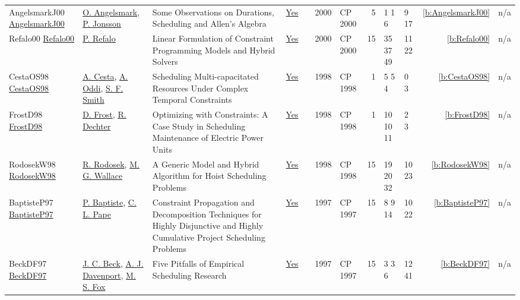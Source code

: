 {\begin{longtable}{>{\raggedright\arraybackslash}p{3cm}>{\raggedright\arraybackslash}p{4.5cm}>{\raggedright\arraybackslash}p{6.0cm}rrrp{2.5cm}rp{1cm}p{1cm}rr}
AngelsmarkJ00 \href{https://doi.org/10.1007/3-540-45349-0_35}{AngelsmarkJ00} & \hyperref[auth:a295]{O. Angelsmark}, \hyperref[auth:a296]{P. Jonsson} & Some Observations on Durations, Scheduling and Allen's Algebra & \href{../works/AngelsmarkJ00.pdf}{Yes} & \cite{AngelsmarkJ00} & 2000 & CP 2000 & 5 & 1 1 6 & 9 17 & \ref{b:AngelsmarkJ00} & n/a\\
Refalo00 \href{https://doi.org/10.1007/3-540-45349-0_27}{Refalo00} & \hyperref[auth:a254]{P. Refalo} & Linear Formulation of Constraint Programming Models and Hybrid Solvers & \href{../works/Refalo00.pdf}{Yes} & \cite{Refalo00} & 2000 & CP 2000 & 15 & 35 37 49 & 11 22 & \ref{b:Refalo00} & n/a\\
CestaOS98 \href{https://doi.org/10.1007/3-540-49481-2_36}{CestaOS98} & \hyperref[auth:a284]{A. Cesta}, \hyperref[auth:a282]{A. Oddi}, \hyperref[auth:a298]{S. F. Smith} & Scheduling Multi-capacitated Resources Under Complex Temporal Constraints & \href{../works/CestaOS98.pdf}{Yes} & \cite{CestaOS98} & 1998 & CP 1998 & 1 & 5 5 4 & 0 3 & \ref{b:CestaOS98} & n/a\\
FrostD98 \href{https://doi.org/10.1007/3-540-49481-2_40}{FrostD98} & \hyperref[auth:a299]{D. Frost}, \hyperref[auth:a300]{R. Dechter} & Optimizing with Constraints: {A} Case Study in Scheduling Maintenance of Electric Power Units & \href{../works/FrostD98.pdf}{Yes} & \cite{FrostD98} & 1998 & CP 1998 & 1 & 10 10 11 & 2 3 & \ref{b:FrostD98} & n/a\\
RodosekW98 \href{https://doi.org/10.1007/3-540-49481-2_28}{RodosekW98} & \hyperref[auth:a297]{R. Rodosek}, \hyperref[auth:a117]{M. G. Wallace} & A Generic Model and Hybrid Algorithm for Hoist Scheduling Problems & \href{../works/RodosekW98.pdf}{Yes} & \cite{RodosekW98} & 1998 & CP 1998 & 15 & 19 20 32 & 10 23 & \ref{b:RodosekW98} & n/a\\
BaptisteP97 \href{https://doi.org/10.1007/BFb0017454}{BaptisteP97} & \hyperref[auth:a162]{P. Baptiste}, \hyperref[auth:a163]{C. L. Pape} & Constraint Propagation and Decomposition Techniques for Highly Disjunctive and Highly Cumulative Project Scheduling Problems & \href{../works/BaptisteP97.pdf}{Yes} & \cite{BaptisteP97} & 1997 & CP 1997 & 15 & 8 9 14 & 10 22 & \ref{b:BaptisteP97} & n/a\\
BeckDF97 \href{https://doi.org/10.1007/BFb0017455}{BeckDF97} & \hyperref[auth:a89]{J. C. Beck}, \hyperref[auth:a248]{A. J. Davenport}, \hyperref[auth:a302]{M. S. Fox} & Five Pitfalls of Empirical Scheduling Research & \href{../works/BeckDF97.pdf}{Yes} & \cite{BeckDF97} & 1997 & CP 1997 & 15 & 3 3 6 & 12 41 & \ref{b:BeckDF97} & n/a\\

\end{longtable}}
